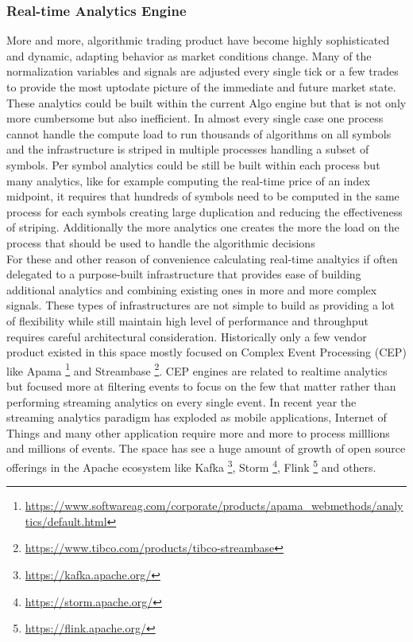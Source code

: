 \subsubsection{Real-time Analytics Engine}
More and more, algorithmic trading product have become highly sophisticated and dynamic, adapting behavior as market conditions change. Many of the normalization variables and signals are adjusted every single tick or a few trades to provide the most uptodate picture of the immediate and future market state. These analytics could be built within the current Algo engine but that is not only more cumbersome but also inefficient. In almost every single case one process cannot handle the compute load to run thousands of algorithms on all symbols and the infrastructure is striped in multiple processes handling a subset of symbols. Per symbol analytics could be still be built within each process but many analytics, like for example computing the real-time price of an index midpoint, it requires that hundreds of symbols need to be computed in the same process for each symbols creating large duplication and reducing the effectiveness of striping. Additionally the more analytics one creates the more the load on the process that should be used to handle the algorithmic decisions\\

For these and other reason of convenience calculating real-time analtyics if often delegated to a purpose-built infrastructure that provides ease of building additional analytics and combining existing ones in more and more complex signals. These types of infrastructures are not simple to build as providing a lot of flexibility while still maintain high level of performance and throughput requires careful architectural consideration.  Historically only a few vendor product existed in this space mostly focused on Complex Event Processing (CEP) like Apama \footnote{\url{https://www.softwareag.com/corporate/products/apama_webmethods/analytics/default.html}} and Streambase \footnote{\url{https://www.tibco.com/products/tibco-streambase}}. CEP engines are related to realtime analytics but focused more at filtering events to focus on the few that matter rather than performing streaming analytics on every single event. In recent year the streaming analytics paradigm has exploded as mobile applications, Internet of Things and many other application require more and more to process milllions and millions of events. The space has see a huge amount of growth of open source offerings in the Apache ecosystem like Kafka \footnote{\url{https://kafka.apache.org/}}, Storm \footnote{\url{https://storm.apache.org/}}, Flink \footnote{\url{https://flink.apache.org/}} and others.


